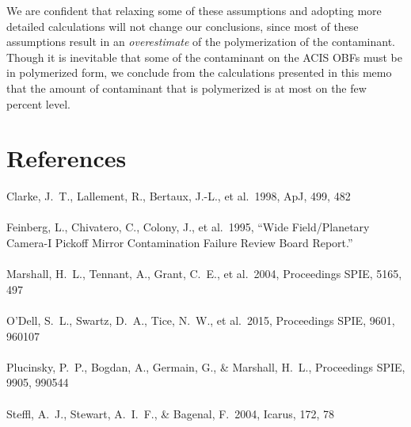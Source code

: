 \documentclass[11pt]{article}
\begin{document}
We are confident that relaxing some of these assumptions and adopting more detailed calculations will not change
our conclusions, since most of these assumptions result in an {\it overestimate} of the polymerization of the
contaminant. Though it is inevitable that some of the contaminant on the ACIS OBFs must be in polymerized form,
we conclude from the calculations presented in this memo that the amount of contaminant that is polymerized is at most
on the few percent level.

\section{References}

Clarke, J.~T., Lallement, R., Bertaux, J.-L., et al.\ 1998, ApJ, 499, 482
\\
\\
\noindent
Feinberg, L., Chivatero, C., Colony, J., et al.\ 1995, ``Wide Field/Planetary Camera-I Pickoff Mirror Contamination Failure Review Board Report.''
\\
\\
\noindent
Marshall, H.~L., Tennant, A., Grant, C.~E., et al.\ 2004, Proceedings SPIE, 5165, 497
\\
\\
\noindent
O'Dell, S.~L., Swartz, D.~A., Tice, N.~W., et al.\ 2015, Proceedings SPIE, 9601, 960107
\\
\\
\noindent
Plucinsky, P.~P., Bogdan, A., Germain, G., \& Marshall, H.~L., Proceedings SPIE, 9905, 990544
\\
\\
\noindent
Steffl, A.~J., Stewart, A.~I.~F., \& Bagenal, F.\ 2004, Icarus, 172, 78
\end{document}

